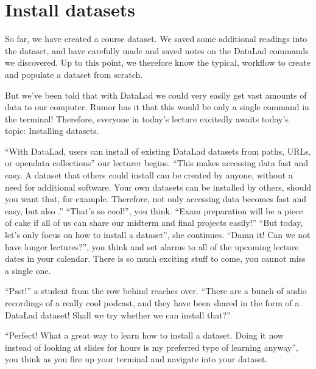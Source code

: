 \section{Install datasets}
\label{\detokenize{basics/101-105-install:install-datasets}}\label{\detokenize{basics/101-105-install:installds}}\label{\detokenize{basics/101-105-install:index-0}}\label{\detokenize{basics/101-105-install::doc}}
\sphinxAtStartPar
So far, we have created a  course dataset. We saved some additional readings
into the dataset, and have carefully made and saved notes on the DataLad
commands we discovered. Up to this point, we therefore know the typical, 
workflow to create and populate a dataset from scratch.

\sphinxAtStartPar
But we’ve been told that with DataLad we could very easily get vast amounts of data to our
computer. Rumor has it that this would be only a single command in the terminal!
Therefore, everyone in today’s lecture excitedly awaits today’s topic: Installing datasets.

\sphinxAtStartPar
“With DataLad, users can install  of existing DataLad datasets from paths, URLs, or
open\sphinxhyphen{}data collections” our lecturer begins.
“This makes accessing data fast and easy. A dataset that others could install can be
created by anyone, without a need for additional software. Your own datasets can be
installed by others, should you want that, for example. Therefore, not only accessing
data becomes fast and easy, but also .”
“That’s so cool!”, you think. “Exam preparation will be a piece of cake if all of us
can share our mid\sphinxhyphen{}term and final projects easily!”
“But today, let’s only focus on how to install a dataset”, she continues.
“Damn it! Can we not have longer lectures?”, you think and set alarms to all of the
upcoming lecture dates in your calendar.
There is so much exciting stuff to come, you cannot miss a single one.

\sphinxAtStartPar
“Psst!” a student from the row behind reaches over. “There are
a bunch of audio recordings of a really cool podcast, and they have been shared in the form
of a DataLad dataset! Shall we try whether we can install that?”

\sphinxAtStartPar
“Perfect! What a great way to learn how to install a dataset. Doing it
now instead of looking at slides for hours is my preferred type of learning anyway”,
you think as you fire up your terminal and navigate into your  dataset.

